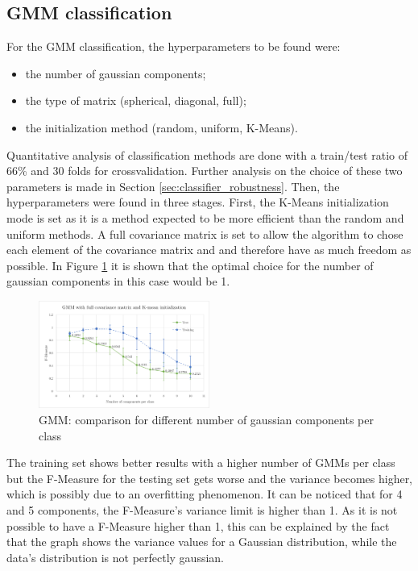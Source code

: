 \documentclass[a4paper,10pt]{article}
\begin{document}
\subsection{GMM classification}
For the GMM classification, the hyperparameters to be found were:

\begin{itemize}
  \item the number of gaussian components;
  \item the type of matrix (spherical, diagonal, full);
  \item the initialization method (random, uniform, K-Means).
\end{itemize}

 
 Quantitative analysis of classification methods are done with a train/test ratio of 66\% and 30 folds for crossvalidation. Further analysis on the choice of these two parameters is made in Section \ref{sec:classifier_robustness}. Then, the hyperparameters were found in three stages. First, the K-Means initialization mode is set as it is a method expected to be more efficient than the random and uniform methods. A full covariance matrix is set to allow the algorithm to chose each element of the covariance matrix and and therefore have as much freedom as possible. In Figure \ref{fig:GMM_graph_1} it is shown that the optimal choice for the number of gaussian components in this case would be 1.\\


\begin{figure}[H]
	\centering
	\includegraphics[width=0.5\textwidth]{pictures/GMM_graph_1}
	\caption{GMM: comparison for different number of gaussian components per class}
	\label{fig:GMM_graph_1}
\end{figure}

The training set shows better results with a higher number of GMMs per class but the F-Measure for the testing set gets worse and the variance becomes higher, which is possibly due to an overfitting phenomenon.
It can be noticed that for 4 and 5 components, the F-Measure's variance limit is higher than 1. As it is not possible to have a F-Measure higher than 1, this can be explained by the fact that the graph shows the variance values for a Gaussian distribution, while the data's distribution is not perfectly gaussian.
\end{document}
